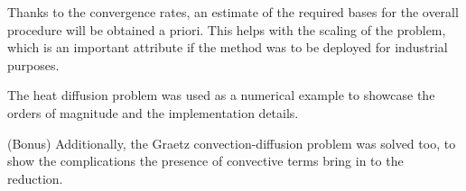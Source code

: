\documentclass[a4paper, technote, compsoc]{IEEEtran}
\begin{document}
Thanks to the convergence rates, an estimate of the required bases for the overall procedure will be obtained a priori.
This helps with the scaling of the problem, which is an important attribute if the method was to be deployed for industrial purposes. 

The heat diffusion problem was used as a numerical example to showcase the orders of magnitude and the implementation details. 

(Bonus) Additionally, the Graetz convection-diffusion problem was solved too, to show the complications the presence of convective terms bring in to the reduction. 
\printbibliography

\end{document}
